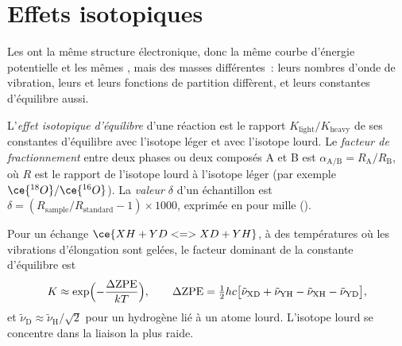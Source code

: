 \section{Effets isotopiques}

Les  ont la même structure électronique, donc la même courbe
d'énergie potentielle et les mêmes , mais des masses
différentes~: leurs nombres d'onde de vibration, leurs  et leurs fonctions de partition diffèrent, et leurs constantes
d'équilibre aussi.

\begin{definition}\label{def:b3:statistical-thermo-applied:isotope-effect}
L'\emph{effet isotopique d'équilibre} d'une
réaction est le rapport $K_{\mathrm{light}}/K_{\mathrm{heavy}}$ de ses
constantes d'équilibre avec l'isotope léger et avec l'isotope lourd. Le
\emph{facteur de fractionnement}
entre deux phases ou deux composés A et B est $\alpha_{\mathrm{A/B}} = R_{\mathrm A}/R_{\mathrm B}$, où
$R$ est le rapport de l'isotope lourd à l'isotope léger (par exemple
$\ce{^{18}O}/\ce{^{16}O}$). La
\emph{valeur $\delta$} d'un échantillon est $\delta = (R_{\mathrm{sample}}/R_{\mathrm{standard}}
- 1) \times 1000$, exprimée en pour mille (\textperthousand).
\end{definition}

\begin{proposition}\label{prop:b3:statistical-thermo-applied:zpe-isotope}
Pour un échange $\ce{XH + YD <=> XD + YH}$, à des températures où les
vibrations d'élongation sont gelées, le facteur dominant de la constante
d'équilibre est
\[
  K \approx \exp\Bigl(-\frac{\Delta\mathrm{ZPE}}{kT}\Bigr), \qquad
  \Delta\mathrm{ZPE} = \tfrac12hc\bigl[\tilde\nu_{\mathrm{XD}} + \tilde\nu_{\mathrm{YH}} - \tilde\nu_{\mathrm{XH}} - \tilde\nu_{\mathrm{YD}}\bigr],
\]
et $\tilde\nu_{\mathrm D} \approx \tilde\nu_{\mathrm H}/\sqrt2$ pour un
hydrogène lié à un atome lourd. L'isotope lourd se concentre dans la
liaison la plus raide.
\end{proposition}


